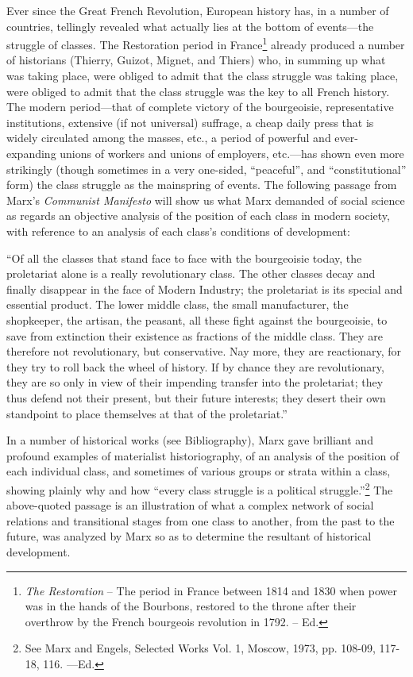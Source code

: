 \documentclass[a4paper,12pt]{book}
\begin{document}
Ever since the Great French Revolution, European history has, in a number of countries, tellingly revealed what actually lies at the bottom of events—the struggle of classes. The Restoration period in France\footnote{\emph{The Restoration} -- The period in France between 1814 and 1830 when power was in the hands of the Bourbons, restored to the throne after their overthrow by the French bourgeois revolution in 1792. -- Ed.} already produced a number of historians (Thierry, Guizot, Mignet, and Thiers) who, in summing up what was taking place, were obliged to admit that the class struggle was taking place, were obliged to admit that the class struggle was the key to all French history. The modern period—that of complete victory of the bourgeoisie, representative institutions, extensive (if not universal) suffrage, a cheap daily press that is widely circulated among the masses, etc., a period of powerful and ever-expanding unions of workers and unions of employers, etc.—has shown even more strikingly (though sometimes in a very one-sided, “peaceful”, and “constitutional” form) the class struggle as the mainspring of events. The following passage from Marx’s \emph{Communist Manifesto} will show us what Marx demanded of social science as regards an objective analysis of the position of each class in modern society, with reference to an analysis of each class’s conditions of development:

\begin{center}
	\footnotesize{“Of all the classes that stand face to face with the bourgeoisie today, the proletariat alone is a really revolutionary class. The other classes decay and finally disappear in the face of Modern Industry; the proletariat is its special and essential product. The lower middle class, the small manufacturer, the shopkeeper, the artisan, the peasant, all these fight against the bourgeoisie, to save from extinction their existence as fractions of the middle class. They are therefore not revolutionary, but conservative. Nay more, they are reactionary, for they try to roll back the wheel of history. If by chance they are revolutionary, they are so only in view of their impending transfer into the proletariat; they thus defend not their present, but their future interests; they desert their own standpoint to place themselves at that of the proletariat.”}
\end{center}

In a number of historical works (see Bibliography), Marx gave brilliant and profound examples of materialist historiography, of an analysis of the position of each individual class, and sometimes of various groups or strata within a class, showing plainly why and how “every class struggle is a political struggle.”\footnote{See Marx and Engels, Selected Works Vol. 1, Moscow, 1973, pp. 108-09, 117-18, 116. —Ed.} The above-quoted passage is an illustration of what a complex network of social relations and transitional stages from one class to another, from the past to the future, was analyzed by Marx so as to determine the resultant of historical development.
\end{document}
